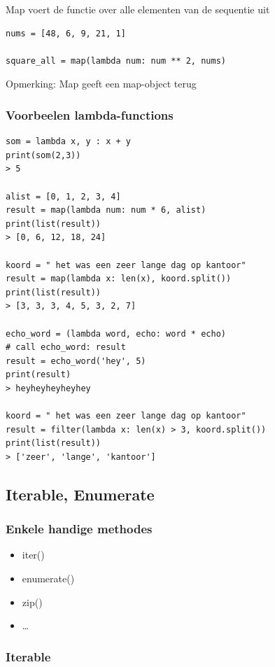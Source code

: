 \documentclass{article}
\begin{document}
Map voert de functie over alle elementen van de sequentie uit

\begin{verbatim}
nums = [48, 6, 9, 21, 1]

square_all = map(lambda num: num ** 2, nums)
\end{verbatim}

Opmerking: Map geeft een map-object terug

\subsubsection{Voorbeelen lambda-functions}

\begin{verbatim}
som = lambda x, y : x + y
print(som(2,3))
> 5

alist = [0, 1, 2, 3, 4]
result = map(lambda num: num * 6, alist)
print(list(result))
> [0, 6, 12, 18, 24]

koord = " het was een zeer lange dag op kantoor"
result = map(lambda x: len(x), koord.split())
print(list(result))
> [3, 3, 3, 4, 5, 3, 2, 7]

echo_word = (lambda word, echo: word * echo)
# call echo_word: result
result = echo_word('hey', 5)
print(result)
> heyheyheyheyhey

koord = " het was een zeer lange dag op kantoor"
result = filter(lambda x: len(x) > 3, koord.split())
print(list(result))
> ['zeer', 'lange', 'kantoor']
\end{verbatim}

\subsection{Iterable, Enumerate}

\subsubsection{Enkele handige methodes}

\begin{itemize}
    \item iter()
    \item enumerate()
    \item zip()
    \item \dots
\end{itemize}

\subsubsection{Iterable}
\end{document}
